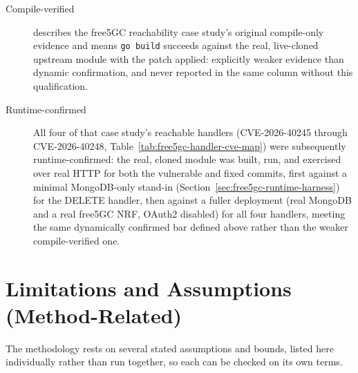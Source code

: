 \documentclass[12pt,a4paper]{report}
\begin{document}
\begin{description}
\item[Compile-verified] describes the free5GC reachability case study's original compile-only evidence and means \texttt{go build} succeeds against the real, live-cloned upstream module with the patch applied: explicitly weaker evidence than dynamic confirmation, and never reported in the same column without this qualification.

\item[Runtime-confirmed] All four of that case study's reachable handlers (CVE-2026-40245 through CVE-2026-40248, Table~\ref{tab:free5gc-handler-cve-map}) were subsequently runtime-confirmed: the real, cloned module was built, run, and exercised over real HTTP for both the vulnerable and fixed commits, first against a minimal MongoDB-only stand-in (Section~\ref{sec:free5gc-runtime-harness}) for the DELETE handler, then against a fuller deployment (real MongoDB and a real free5GC NRF, OAuth2 disabled) for all four handlers, meeting the same dynamically confirmed bar defined above rather than the weaker compile-verified one.
\end{description}

\section{Limitations and Assumptions (Method-Related)}
\label{sec:limitations-method-related}

The methodology rests on several stated assumptions and bounds, listed here individually rather than run together, so each can be checked on its own terms.
\end{document}
